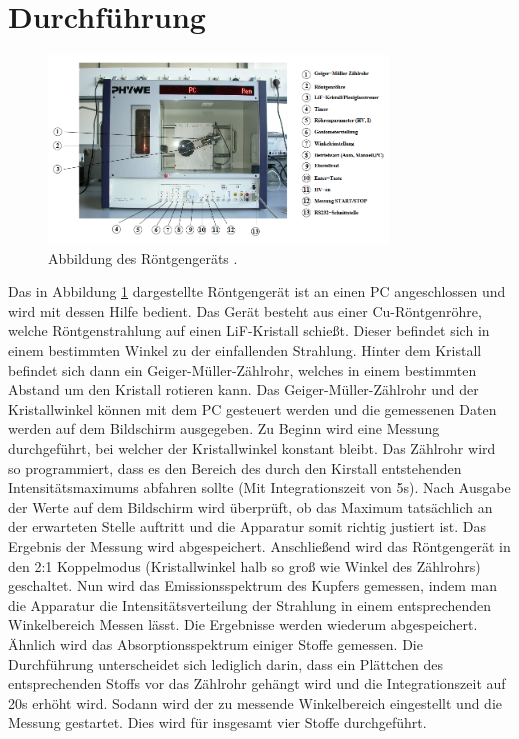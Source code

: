 \section{Durchführung}
\label{sec:Durchführung}
\begin{figure}[H]
  \centering
  \includegraphics[height=5cm]{geraet.PNG}
  \caption{Abbildung des Röntgengeräts \cite{sample}.}
  \label{fig:geraet}
\end{figure}

Das in Abbildung \ref{fig:geraet} dargestellte Röntgengerät ist an einen PC
angeschlossen und wird mit dessen Hilfe bedient. Das Gerät besteht aus einer Cu-Röntgenröhre, welche
Röntgenstrahlung auf einen LiF-Kristall schießt. Dieser befindet sich in einem bestimmten Winkel
zu der einfallenden Strahlung. Hinter dem Kristall befindet sich dann ein Geiger-Müller-Zählrohr, welches
in einem bestimmten Abstand um den Kristall rotieren kann. Das Geiger-Müller-Zählrohr und
der Kristallwinkel können mit dem PC gesteuert werden und die gemessenen Daten
werden auf dem Bildschirm ausgegeben.
Zu Beginn wird eine Messung durchgeführt, bei welcher der Kristallwinkel konstant
bleibt. Das Zählrohr wird so programmiert, dass es den Bereich des durch den
Kirstall entstehenden Intensitätsmaximums abfahren sollte (Mit Integrationszeit von 5s).
Nach Ausgabe der Werte auf dem Bildschirm wird überprüft, ob das Maximum tatsächlich an der
erwarteten Stelle auftritt und die Apparatur somit richtig justiert ist. Das Ergebnis der
Messung wird abgespeichert.
Anschließend wird das Röntgengerät in den 2:1 Koppelmodus (Kristallwinkel halb so
groß wie Winkel des Zählrohrs) geschaltet.
Nun wird das Emissionsspektrum des Kupfers gemessen, indem man die Apparatur
die Intensitätsverteilung der Strahlung in einem entsprechenden Winkelbereich
Messen lässt. Die Ergebnisse werden wiederum abgespeichert.
Ähnlich wird das Absorptionsspektrum einiger Stoffe gemessen. Die Durchführung unterscheidet
sich lediglich darin, dass ein Plättchen des entsprechenden Stoffs vor das Zählrohr
gehängt wird und die Integrationszeit auf 20s erhöht wird. Sodann wird der zu messende
Winkelbereich eingestellt und die Messung gestartet. Dies wird für insgesamt vier
Stoffe durchgeführt.
